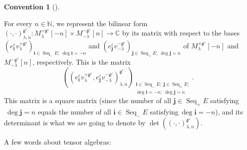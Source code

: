 \documentclass
[numbers=enddot,12pt,final,onecolumn,german,notitlepage]{scrartcl}%
\theoremstyle{definition}
\newtheorem{conv}[theo]{Convention}
\newenvironment{Convention}[1][]
{\begin{conv}[#1]\begin{leftbar}}
{\end{leftbar}\end{conv}}
\begin{document}
\begin{Convention}
For every $n\in\mathbb{N}$, we represent the bilinear form $\left(
\cdot,\cdot\right)  _{\lambda,n}^{\mathfrak{g}^{\varepsilon}}:M_{\lambda
}^{+\mathfrak{g}^{\varepsilon}}\left[  -n\right]  \times M_{-\lambda
}^{-\mathfrak{g}^{\varepsilon}}\left[  n\right]  \rightarrow\mathbb{C}$ by its
matrix with respect to the bases $\left(  e_{\mathbf{i}}^{\varepsilon
}v_{\lambda}^{+\mathfrak{g}^{\varepsilon}}\right)  _{\mathbf{i}\in
\operatorname*{Seq}\nolimits_{-}E;\ \deg\mathbf{i}=-n}$ and $\left(
e_{\mathbf{j}}^{\varepsilon}v_{-\lambda}^{-\mathfrak{g}^{\varepsilon}}\right)
_{\mathbf{j}\in\operatorname*{Seq}\nolimits_{+}E;\ \deg\mathbf{j}=n}$ of
$M_{\lambda}^{+\mathfrak{g}^{\varepsilon}}\left[  -n\right]  $ and
$M_{-\lambda}^{-\mathfrak{g}^{\varepsilon}}\left[  n\right]  $, respectively.
This is the matrix%
\[
\left(  \left(  e_{\mathbf{i}}^{\varepsilon}v_{\lambda}^{+\mathfrak{g}%
^{\varepsilon}},e_{\mathbf{j}}^{\varepsilon}v_{-\lambda}^{-\mathfrak{g}%
^{\varepsilon}}\right)  _{\lambda,n}^{\mathfrak{g}^{\varepsilon}}\right)
_{\substack{\mathbf{i}\in\operatorname*{Seq}\nolimits_{-}E;\ \mathbf{j}%
\in\operatorname*{Seq}\nolimits_{+}E;\\\deg\mathbf{i}=-n;\ \deg\mathbf{j}%
=n}}.
\]
This matrix is a square matrix (since the number of all $\mathbf{j}%
\in\operatorname*{Seq}\nolimits_{+}E$ satisfying$\ \deg\mathbf{j}=n$ equals
the number of all $\mathbf{i}\in\operatorname*{Seq}\nolimits_{-}E$
satisfying$\ \deg\mathbf{i}=-n$), and its determinant is what we are going to
denote by $\det\left(  \left(  \cdot,\cdot\right)  _{\lambda,n}^{\mathfrak{g}%
^{\varepsilon}}\right)  $.
\end{Convention}

A few words about tensor algebras:
\end{document}
